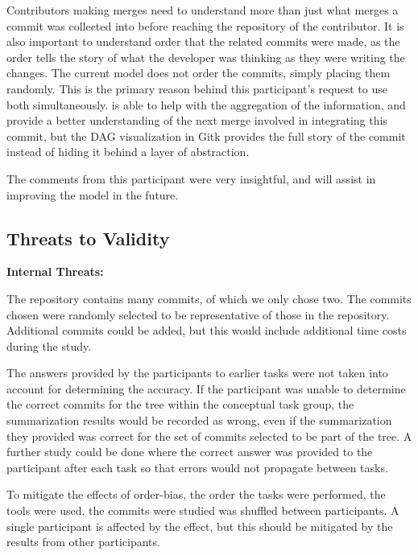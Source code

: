 Contributors making merges need to understand more than just what merges
a commit was collected into before reaching the repository of the
contributor. It is also important to understand order that the related
commits were made, as the order tells the story of what the developer
was thinking as they were writing the changes. The current \mt model
does not order the commits, simply placing them randomly.  This is the
primary reason behind this participant's request to use both 
simultaneously. \tool is able to help with the aggregation of the
information, and provide a better understanding of the next merge
involved in integrating this commit, but the DAG visualization in Gitk
provides the full story of the commit instead of hiding it behind a
layer of abstraction.

The comments from this participant were very insightful, and will assist
in improving the model in the future.

\subsection{Threats to Validity}
\label{sub:threats}

\textbf{Internal Threats:}

The repository contains many commits, of which we only chose two. The
commits chosen were randomly selected to be representative of those in
the repository. Additional commits could be added, but this would
include additional time costs during the study.

The answers provided by the participants to earlier tasks were not
taken into account for determining the accuracy. If the participant was
unable to determine the correct commits for the tree within the
conceptual task group, the summarization results would be recorded as
wrong, even if the summarization they provided was correct for the set
of commits selected to be part of the tree. A further study could be
done where the correct answer was provided to the participant after each
task so that errors would not propagate between tasks.

To mitigate the effects of order-bias, the order the tasks were
performed, the tools were used, the commits were studied was shuffled
between participants. A single participant is affected by the effect,
but this should be mitigated by the results from other participants.

